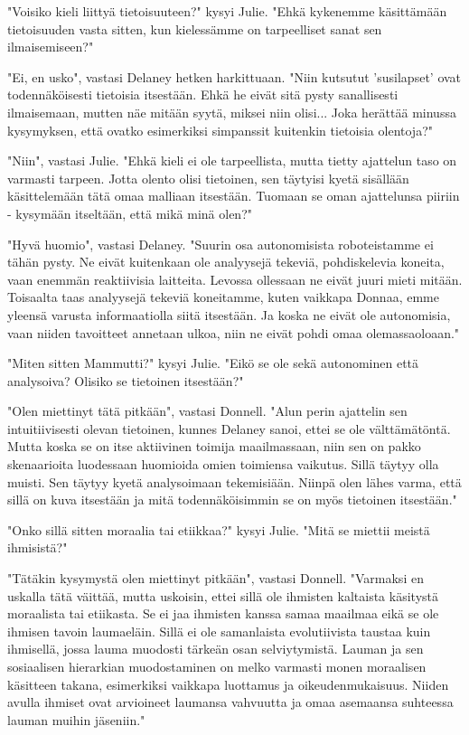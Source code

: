 "Voisiko kieli liittyä tietoisuuteen?" kysyi Julie. "Ehkä kykenemme käsittämään tietoisuuden vasta sitten, kun kielessämme on tarpeelliset sanat sen ilmaisemiseen?"


"Ei, en usko", vastasi Delaney hetken harkittuaan. "Niin kutsutut 'susilapset' ovat todennäköisesti tietoisia itsestään. Ehkä he eivät sitä pysty sanallisesti ilmaisemaan, mutten näe mitään syytä, miksei niin olisi... Joka herättää minussa kysymyksen, että ovatko esimerkiksi simpanssit kuitenkin tietoisia olentoja?"


"Niin", vastasi Julie. "Ehkä kieli ei ole tarpeellista, mutta tietty ajattelun taso on varmasti tarpeen. Jotta olento olisi tietoinen, sen täytyisi kyetä sisällään käsittelemään tätä omaa malliaan itsestään. Tuomaan se oman ajattelunsa piiriin - kysymään itseltään, että mikä minä olen?"


"Hyvä huomio", vastasi Delaney. "Suurin osa autonomisista roboteistamme ei tähän pysty. Ne eivät kuitenkaan ole analyysejä tekeviä, pohdiskelevia koneita, vaan enemmän reaktiivisia laitteita. Levossa ollessaan ne eivät juuri mieti mitään. Toisaalta taas analyysejä tekeviä koneitamme, kuten vaikkapa Donnaa, emme yleensä varusta informaatiolla siitä itsestään. Ja koska ne eivät ole autonomisia, vaan niiden tavoitteet annetaan ulkoa, niin ne eivät pohdi omaa olemassaoloaan."


"Miten sitten Mammutti?" kysyi Julie. "Eikö se ole sekä autonominen että analysoiva? Olisiko se tietoinen itsestään?"


"Olen miettinyt tätä pitkään", vastasi Donnell. "Alun perin ajattelin sen intuitiivisesti olevan tietoinen, kunnes Delaney sanoi, ettei se ole välttämätöntä. Mutta koska se on itse aktiivinen toimija maailmassaan, niin sen on pakko skenaarioita luodessaan huomioida omien toimiensa vaikutus. Sillä täytyy olla muisti. Sen täytyy kyetä analysoimaan tekemisiään. Niinpä olen lähes varma, että sillä on kuva itsestään ja mitä todennäköisimmin se on myös tietoinen itsestään."


"Onko sillä sitten moraalia tai etiikkaa?" kysyi Julie. "Mitä se miettii meistä ihmisistä?"


"Tätäkin kysymystä olen miettinyt pitkään", vastasi Donnell. "Varmaksi en uskalla tätä väittää, mutta uskoisin, ettei sillä ole ihmisten kaltaista käsitystä moraalista tai etiikasta. Se ei jaa ihmisten kanssa samaa maailmaa eikä se ole ihmisen tavoin laumaeläin. Sillä ei ole samanlaista evolutiivista taustaa kuin ihmisellä, jossa lauma muodosti tärkeän osan selviytymistä. Lauman ja sen sosiaalisen hierarkian muodostaminen on melko varmasti monen moraalisen käsitteen takana, esimerkiksi vaikkapa luottamus ja oikeudenmukaisuus. Niiden avulla ihmiset ovat arvioineet laumansa vahvuutta ja omaa asemaansa suhteessa lauman muihin jäseniin."


